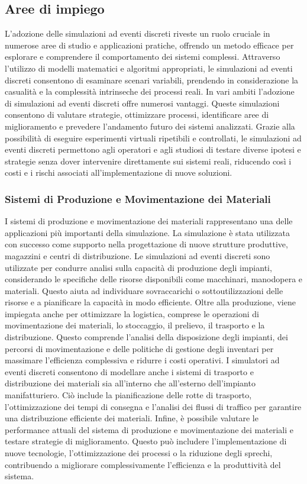 \documentclass[12pt,a4paper,openright,twoside]{book}
\begin{document}
\subsection{Aree di impiego}

L'adozione delle simulazioni ad eventi discreti riveste un ruolo cruciale in numerose aree di studio e applicazioni pratiche, offrendo un metodo efficace per esplorare e comprendere il comportamento dei sistemi complessi. Attraverso l'utilizzo di modelli matematici e algoritmi appropriati, le simulazioni ad eventi discreti consentono di esaminare scenari variabili, prendendo in considerazione la casualità e la complessità intrinseche dei processi reali.
In vari ambiti l'adozione di simulazioni ad eventi discreti offre numerosi vantaggi. Queste simulazioni consentono di valutare strategie, ottimizzare processi, identificare aree di miglioramento e prevedere l'andamento futuro dei sistemi analizzati. Grazie alla possibilità di eseguire esperimenti virtuali ripetibili e controllati, le simulazioni ad eventi discreti permettono agli operatori e agli studiosi di testare diverse ipotesi e strategie senza dover intervenire direttamente sui sistemi reali, riducendo così i costi e i rischi associati all'implementazione di nuove soluzioni.

\subsubsection{Sistemi di Produzione e Movimentazione dei Materiali}
I sistemi di produzione e movimentazione dei materiali rappresentano una delle applicazioni più importanti della simulazione. La simulazione è stata utilizzata con successo come supporto nella progettazione di nuove strutture produttive, magazzini e centri di distribuzione.
Le simulazioni ad eventi discreti sono utilizzate per condurre analisi sulla capacità di produzione degli impianti, considerando le specifiche delle risorse disponibili come macchinari, manodopera e materiali. Questo aiuta ad individuare sovraccarichi o sottoutilizzazioni delle risorse e a pianificare la capacità in modo efficiente. 
Oltre alla produzione, viene impiegata anche per ottimizzare la logistica, comprese le operazioni di movimentazione dei materiali, lo stoccaggio, il prelievo, il trasporto e la distribuzione. Questo comprende l'analisi della disposizione degli impianti, dei percorsi di movimentazione e delle politiche di gestione degli inventari per massimare l'efficienza complessiva e ridurre i costi operativi. 
I simulatori ad eventi discreti consentono di modellare anche i sistemi di trasporto e distribuzione dei materiali sia all'interno che all'esterno dell'impianto manifatturiero. Ciò include la pianificazione delle rotte di trasporto, l'ottimizzazione dei tempi di consegna e l'analisi dei flussi di traffico per garantire una distribuzione efficiente dei materiali.
Infine, è possibile valutare le performance attuali del sistema di produzione e movimentazione dei materiali e testare strategie di miglioramento. Questo può includere l'implementazione di nuove tecnologie, l'ottimizzazione dei processi o la riduzione degli sprechi, contribuendo a migliorare complessivamente l'efficienza e la produttività del sistema.
\end{document}
